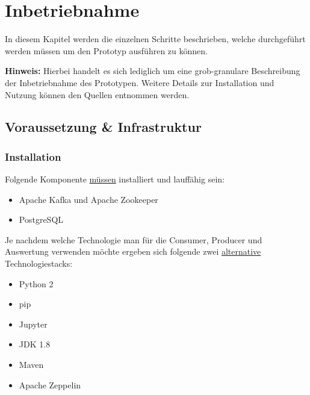 \chapter{Inbetriebnahme}
\label{chap:betrieb}
In diesem Kapitel werden die einzelnen Schritte beschrieben, welche durchgeführt werden müssen um den Prototyp ausführen zu können.

\textbf{Hinweis:}
\newline
Hierbei handelt es sich lediglich um eine grob-granulare Beschreibung der Inbetriebnahme des Prototypen.
Weitere Details zur Installation und Nutzung können den Quellen entnommen werden.

\section{Voraussetzung \& Infrastruktur}
\subsection{Installation}
Folgende Komponente \underline{müssen}  installiert und lauffähig sein:
\begin{itemize}
  \item Apache Kafka und Apache Zookeeper
  \item PostgreSQL
\end{itemize}


Je nachdem welche Technologie man für die Consumer, Producer und Auswertung verwenden möchte ergeben sich folgende zwei \underline{alternative} Technologiestacks:

\begin{multicols}{2}
	\begin{itemize}
		\item Python 2
		\item pip
		\item Jupyter
	\end{itemize}
\columnbreak
	\begin{itemize}
		\item JDK 1.8
		\item Maven
		\item Apache Zeppelin
	\end{itemize}
\end{multicols}

